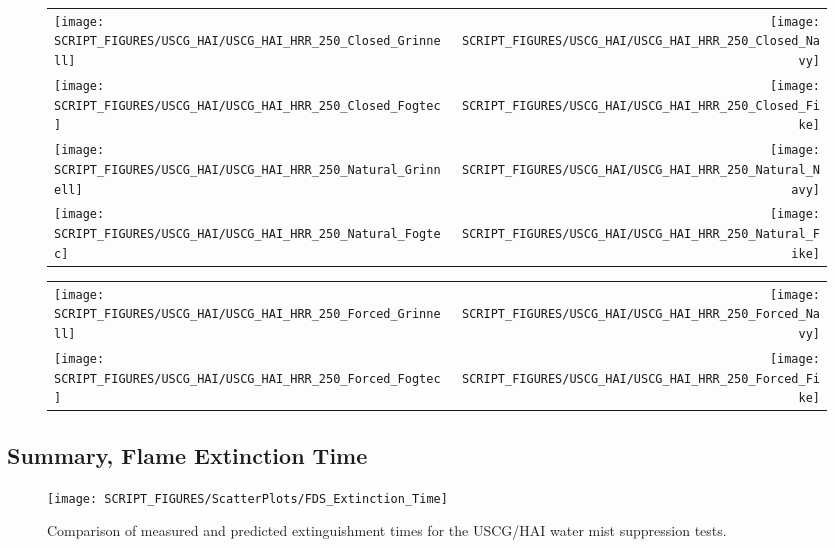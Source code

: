 \begin{figure}[p]
\begin{tabular*}{\textwidth}{l@{\extracolsep{\fill}}r}
\texttt{[image: SCRIPT\_FIGURES/USCG\_HAI/USCG\_HAI\_HRR\_250\_Closed\_Grinnell]} &
\texttt{[image: SCRIPT\_FIGURES/USCG\_HAI/USCG\_HAI\_HRR\_250\_Closed\_Navy]} \\
\texttt{[image: SCRIPT\_FIGURES/USCG\_HAI/USCG\_HAI\_HRR\_250\_Closed\_Fogtec]} &
\texttt{[image: SCRIPT\_FIGURES/USCG\_HAI/USCG\_HAI\_HRR\_250\_Closed\_Fike]} \\
\texttt{[image: SCRIPT\_FIGURES/USCG\_HAI/USCG\_HAI\_HRR\_250\_Natural\_Grinnell]} &
\texttt{[image: SCRIPT\_FIGURES/USCG\_HAI/USCG\_HAI\_HRR\_250\_Natural\_Navy]} \\
\texttt{[image: SCRIPT\_FIGURES/USCG\_HAI/USCG\_HAI\_HRR\_250\_Natural\_Fogtec]} &
\texttt{[image: SCRIPT\_FIGURES/USCG\_HAI/USCG\_HAI\_HRR\_250\_Natural\_Fike]}
\end{tabular*}
\label{USCG_HAI_8}
\end{figure}


\begin{figure}[p]
\begin{tabular*}{\textwidth}{l@{\extracolsep{\fill}}r}
\texttt{[image: SCRIPT\_FIGURES/USCG\_HAI/USCG\_HAI\_HRR\_250\_Forced\_Grinnell]} &
\texttt{[image: SCRIPT\_FIGURES/USCG\_HAI/USCG\_HAI\_HRR\_250\_Forced\_Navy]} \\
\texttt{[image: SCRIPT\_FIGURES/USCG\_HAI/USCG\_HAI\_HRR\_250\_Forced\_Fogtec]} &
\texttt{[image: SCRIPT\_FIGURES/USCG\_HAI/USCG\_HAI\_HRR\_250\_Forced\_Fike]}
\end{tabular*}
\label{USCG_HAI_9}
\end{figure}

\clearpage

\subsection{Summary, Flame Extinction Time}
\label{Extinction Time}

\begin{figure}[h!]
\begin{center}
\texttt{[image: SCRIPT\_FIGURES/ScatterPlots/FDS\_Extinction\_Time]}
\caption[Extinguishment times for the USCG/HAI water mist suppression tests]{Comparison of measured and predicted extinguishment times for the USCG/HAI water mist suppression tests.}
\label{USCG_Scatter}
\end{center}
\end{figure}

